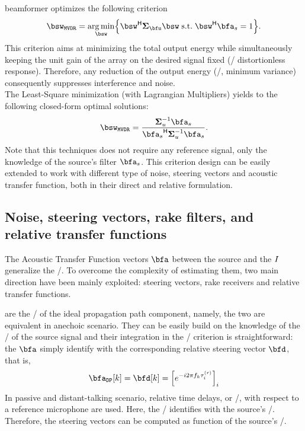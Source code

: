  beamformer optimizes the following criterion
\begin{equation}
    \bsw_{\MVDR} = \kargmin_{\bsw} \kbrace{ \khermitian{\bsw} \xpsd_{\bfu} \bsw\;\text{s.t.}\;\khermitian{\bsw} \bfa_{\src} = 1}
    .
\end{equation}
This criterion aims at minimizing the total output energy while simultaneously keeping the unit gain of the array on the desired signal fixed (\ie/ distortionless response).
Therefore, any reduction of the output energy (\ie/, minimum variance) consequently suppresses interference and noise.
\\The Least-Square minimization (with Lagrangian Multipliers) yields to the following closed-form optimal solutions:
\begin{equation}\label{eq:dechorateapp:mvdr}
    \bsw_{\MVDR} = \frac{\kinv{\xpsd}_{u} \bfa_{\src}}
                                {\khermitian{\bfa_\src} \kinv{\xpsd}_{u} \bfa_\src}
    .
\end{equation}
Note that this techniques does not require any reference signal, only the knowledge of the source's filter $\bfa_\src$.
This criterion design can be easily extended to work with different type of noise, steering vectors and acoustic transfer function, both in their direct and relative formulation.

\subsection{Noise, steering vectors, rake filters, and relative transfer functions}

The Acoustic Transfer Function vectors $\bfa$ between the source and the $I$ generalize the \RTFs/.
To overcome the complexity of estimating them, two main direction have been mainly exploited: steering vectors, rake receivers and relative transfer functions.

 are the \RTFs/ of the ideal propagation path component, namely, the two are equivalent in anechoic scenario.
They can be easily build on the knowledge of the \TOA/ of the source signal and their integration in the \MVDR/ criterion is straightforward: the $\bfa$ simply identify with the corresponding relative steering vector $\bfd$, that is,
\begin{equation}
    \bfa_{\mathtt{DP}}[k] = \bfd[k] = \kbracket{ \cste^{-\csti 2 \pi f_k \tau_i^{(r)}} }_i
\end{equation}
In passive and distant-talking scenario, relative time delays, or \TDOAs/, with respect to a reference microphone are used.
Here, the \TDOAs/ identifies with the source's \DOA/. Therefore, the steering vectors can be computed as function of the source's \DOA/.

